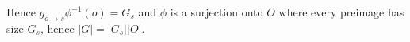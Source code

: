 \documentclass{article}
\def\inv{{-1}}
\begin{document}
Hence $g_{o \to s}\phi^\inv(o) = G_s$ and $\phi$ is a surjection onto $O$ where every preimage has size $G_s$, hence $|G| = |G_s| |O|$.



\end{document}
